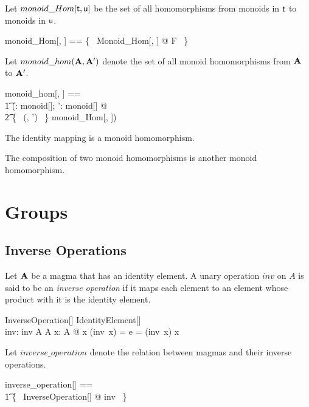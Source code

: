 \documentclass{amsart}
\begin{document}
Let $monoid\_Hom[\mathsf{t}, \mathsf{u}]$ be the set of all homomorphisms from monoids in $\mathsf{t}$
to monoids in $\mathsf{u}$.

\begin{zed}
	monoid\_Hom[\genT, \genU] == \{~ Monoid\_Hom[\genT, \genU] @ F ~\}
\end{zed}

Let $monoid\_hom(\mathbf{A}, \mathbf{A}')$ denote the set of all monoid homomorphisms from $\mathbf{A}$ to $\mathbf{A}'$.

\begin{zed}
	monoid\_hom[\genT, \genU] == \\
	\t1	(\lambda \strucA: monoid[\genT]; \strucA': monoid[\genU] @ \\
	\t2		\{~ (\strucA, \strucA') ~\} \dres monoid\_Hom[\genT, \genU])
\end{zed}

\begin{remark}
The identity mapping is a monoid homomorphism.
\end{remark}

\begin{remark}
The composition of two monoid homomorphisms is another monoid homomorphism.
\end{remark}

\section{Groups}

\subsection{Inverse Operations}

Let $\mathbf{A}$ be a magma that has an identity element.
A unary operation $inv$ on $A$ is said to be an \textit{inverse operation} if it maps each element
to an element whose product with it is the identity element.

\begin{schema}{InverseOperation}[\genT]
	IdentityElement[\genT] \\
	inv: \genT \pfun \genT
\where
	inv \in A \fun A
\also
	\forall x: A @ x \opG (inv~x) = e = (inv~x)  \opG x
\end{schema}

Let $inverse\_operation$ denote the relation between magmas and their inverse operations.
\begin{zed}
	inverse\_operation[\genT] == \\
	\t1	\{~ InverseOperation[\genT] @ \strucA \mapsto inv ~\}
\end{zed}
\end{document}

